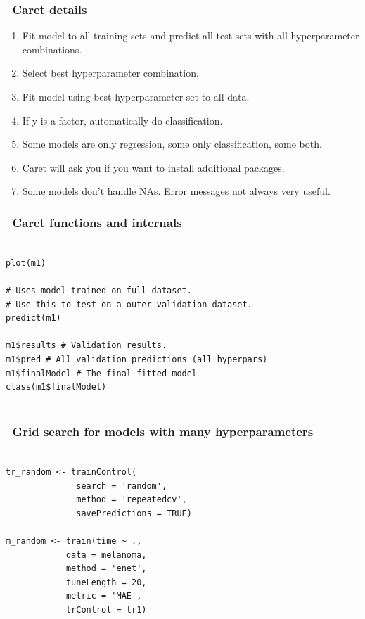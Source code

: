 \documentclass[handout, aspectratio = 169]{beamer}
\begin{document}
\begin{frame}
\frametitle{\insertframenumber~Caret details}
\begin{enumerate}
\item Fit model to all training sets and predict all test sets with all hyperparameter combinations.
\item Select best hyperparameter combination.
\item Fit model using best hyperparameter set to all data.
\item If y is a factor, automatically do classification.
\item Some models are only regression, some only classification, some both.
\item Caret will ask you if you want to install additional packages.
\item Some models don't handle NAs. Error messages not always very useful.
\end{enumerate}

\end{frame} 




\begin{frame}[fragile]
\frametitle{\insertframenumber~Caret functions and internals}
\begin{Verbatim}

plot(m1)

# Uses model trained on full dataset.
# Use this to test on a outer validation dataset.
predict(m1) 

m1$results # Validation results.
m1$pred # All validation predictions (all hyperpars)
m1$finalModel # The final fitted model
class(m1$finalModel)


\end{Verbatim}

\end{frame} 




\begin{frame}[fragile]
\frametitle{\insertframenumber~Grid search for models with many hyperparameters}
\begin{Verbatim}

tr_random <- trainControl(
              search = 'random',
              method = 'repeatedcv',
              savePredictions = TRUE)

m_random <- train(time ~ ., 
            data = melanoma,
            method = 'enet',
            tuneLength = 20,
            metric = 'MAE',
            trControl = tr1)
            
\end{Verbatim}

\end{frame} 
\end{document}
